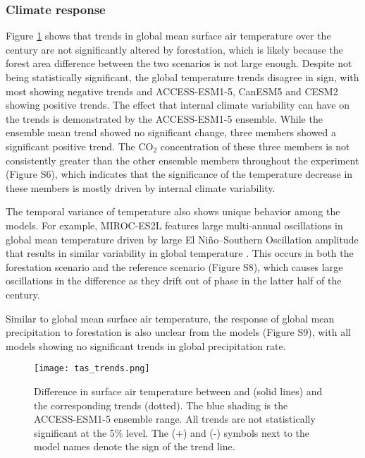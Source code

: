 \documentclass[draft]{agujournal2019}
\begin{document}
\subsubsection{Climate response}

Figure \ref{fig:models_tas_trends} shows that trends in global mean surface air temperature over the century are not significantly altered by forestation, which is likely because the forest area difference between the two scenarios is not large enough.
Despite not being statistically significant, the global temperature trends disagree in sign, with most showing negative trends and ACCESS-ESM1-5, CanESM5 and CESM2 showing positive trends.
The effect that internal climate variability can have on the trends is demonstrated by the ACCESS-ESM1-5 ensemble.
While the ensemble mean trend showed no significant change, three members showed a significant positive trend.
The CO$_2$ concentration of these three members is not consistently greater than the other ensemble members throughout the experiment (Figure S6), which indicates that the significance of the temperature decrease in these members is mostly driven by internal climate variability.

The temporal variance of temperature also shows unique behavior among the models.
For example, MIROC-ES2L features large multi-annual oscillations in global mean temperature driven by large El Niño–Southern Oscillation amplitude that results in similar variability in global temperature \cite{hajima_development_2020}.
This occurs in both the forestation scenario and the reference scenario (Figure S8), which causes large oscillations in the difference as they drift out of phase in the latter half of the century.

Similar to global mean surface air temperature, the response of global mean precipitation to forestation is also unclear from the models (Figure S9), with all models showing no significant trends in global precipitation rate.

\begin{figure}
    \texttt{[image: tas\_trends.png]}
    \caption{Difference in surface air temperature between  and  (solid lines) and the corresponding trends (dotted). The blue shading is the ACCESS-ESM1-5 ensemble range. All trends are not statistically significant at the 5\% level. The (+) and (-) symbols next to the model names denote the sign of the trend line.}
    \label{fig:models_tas_trends}
\end{figure}
\end{document}
